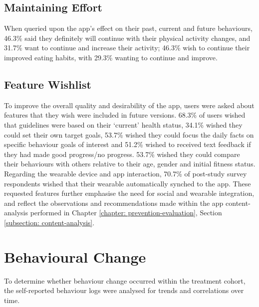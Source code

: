 \subsection{Maintaining Effort}
When queried upon the app's effect on their past, current and future behaviours, 46.3\% said they definitely will continue with their physical activity changes, and 31.7\% want to continue and increase their activity; 46.3\% wish to continue their improved eating habits, with 29.3\% wanting to continue and improve.

\subsection{Feature Wishlist}
To improve the overall quality and desirability of the app, users were asked about features that they wish were included in future versions.
68.3\% of users wished that guidelines were based on their ‘current’ health status, 34.1\% wished they could set their own target goals, 53.7\% wished they could focus the daily facts on specific behaviour goals of interest and 51.2\% wished to received text feedback if they had made good progress/no progress. 53.7\% wished they could compare their behaviours with others relative to their age, gender and initial fitness status. Regarding the wearable device and app interaction, 70.7\% of post-study survey respondents wished that their wearable automatically synched to the app.
These requested features further emphasise the need for social and wearable integration, and reflect the observations and recommendations made within the app content-analysis performed in Chapter \ref{chapter: prevention-evaluation}, Section \ref{subsection: content-analysis}.

\section{Behavioural Change}
To determine whether behaviour change occurred within the treatment cohort, the self-reported behaviour logs were analysed for trends and correlations over time.

